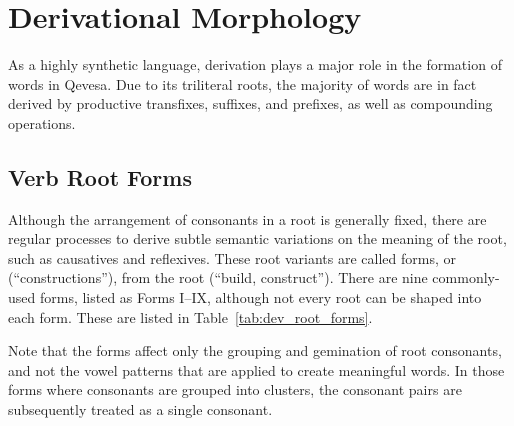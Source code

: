 \documentclass[grammar]{subfiles}
\begin{document}
  \chapter{Derivational Morphology}
  \label{ch:derivational-morphology}

  As a highly synthetic language, derivation plays a major role in the formation of words in Qevesa. Due to its triliteral roots, the majority of words are in fact derived by productive transfixes, suffixes, and prefixes, as well as compounding operations.

  \section{Verb Root Forms}
  \label{sec:dev_verb_root_forms}

  Although the arrangement of consonants in a root is generally fixed, there are regular processes to derive subtle semantic variations on the meaning of the root, such as causatives and reflexives. These root variants are called forms, or  (“constructions”), from the root  (“build, construct”). There are nine commonly-used forms, listed as Forms I–IX, although not every root can be shaped into each form. These are listed in Table~\ref{tab:dev_root_forms}.

  Note that the forms affect only the grouping and gemination of root consonants, and not the vowel patterns that are applied to create meaningful words. In those forms where consonants are grouped into clusters, the consonant pairs are subsequently treated as a single consonant.

\end{document}

